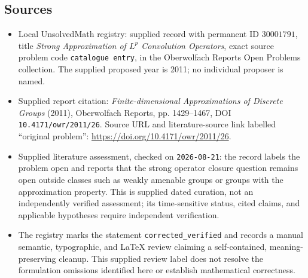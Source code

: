 \documentclass[11pt]{article}
\begin{document}
\subsection{Sources}
\begin{itemize}
\item Local UnsolvedMath registry: supplied record with permanent ID \(30001791\), title \emph{Strong Approximation of \(L^p\) Convolution Operators}, exact source problem code \texttt{catalogue entry}, in the Oberwolfach Reports Open Problems collection. The supplied proposed year is 2011; no individual proposer is named.
\item Supplied report citation: \emph{Finite-dimensional Approximations of Discrete Groups} (2011), Oberwolfach Reports, pp. 1429--1467, DOI \texttt{10.4171/owr/2011/26}. Source URL and literature-source link labelled ``original problem'': \url{https://doi.org/10.4171/owr/2011/26}.
\item Supplied literature assessment, checked on \texttt{2026-08-21}: the record labels the problem open and reports that the strong operator closure question remains open outside classes such as weakly amenable groups or groups with the approximation property. This is supplied dated curation, not an independently verified assessment; its time-sensitive status, cited claims, and applicable hypotheses require independent verification.
\item The registry marks the statement \texttt{corrected\_verified} and records a manual semantic, typographic, and LaTeX review claiming a self-contained, meaning-preserving cleanup. This supplied review label does not resolve the formulation omissions identified here or establish mathematical correctness.
\end{itemize}
\end{document}

